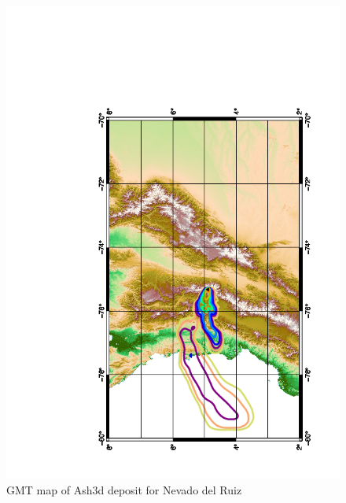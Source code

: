 \begin{figure}[htbp]
\includegraphics[angle=-90,scale=0.6]{Figures/NevadoDelRuiz89.png}
\parbox{15cm}{\caption{\label{FigAsh3dAsh3d_NevDeRuizGMT}
GMT map of Ash3d deposit for Nevado del Ruiz}}
\end{figure}














